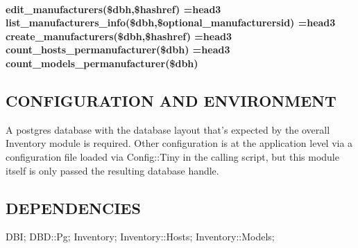 \documentclass{book}
\begin{document}
\paragraph*{edit\protect\_manufacturers(\$dbh,\$hashref) =head3 list\protect\_manufacturers\protect\_info(\$dbh,\$optional\protect\_manufacturersid) =head3 create\protect\_manufacturers(\$dbh,\$hashref) =head3 count\protect\_hosts\protect\_permanufacturer(\$dbh) =head3 count\protect\_models\protect\_permanufacturer(\$dbh)}
\label{Inventory::Manufacturers_edit_manufacturers_dbh_hashref_head3_list_manufacturers_info_dbh_optional_manufacturersid_head3_create_manufacturers_dbh_hashref_head3_count_hosts_permanufacturer_dbh_head3_count_models_permanufacturer_dbh_}
\hypertarget{Inventory::Manufacturers_edit_manufacturers_dbh_hashref_head3_list_manufacturers_info_dbh_optional_manufacturersid_head3_create_manufacturers_dbh_hashref_head3_count_hosts_permanufacturer_dbh_head3_count_models_permanufacturer_dbh_}{}


\subsection{CONFIGURATION AND ENVIRONMENT}
\label{Inventory::Manufacturers_CONFIGURATION_AND_ENVIRONMENT}
\hypertarget{Inventory::Manufacturers_CONFIGURATION_AND_ENVIRONMENT}{}



A postgres database with the database layout that's expected by the overall Inventory module is required. Other configuration is at the application level via a configuration file loaded via Config::Tiny in the calling script, but this module itself is only passed the resulting database handle.


\subsection{DEPENDENCIES}
\label{Inventory::Manufacturers_DEPENDENCIES}
\hypertarget{Inventory::Manufacturers_DEPENDENCIES}{}



DBI; DBD::Pg; Inventory; Inventory::Hosts; Inventory::Models;
\end{document}
